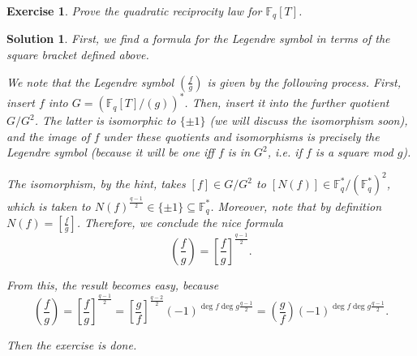 \documentclass{article}
\newtheorem{ex}{Exercise}
\theoremstyle{nonumberplain}
\newtheorem{sol}{Solution}
\newcommand{\FF}{\mathbb{F}}
\newcommand{\legendre}[2]{\genfrac{(}{)}{}{}{#1}{#2}}
\newcommand{\blegendre}[2]{\genfrac{[}{]}{}{}{#1}{#2}}
\begin{document}
\begin{ex}
Prove the quadratic reciprocity law for $\FF_q[T]$.
\end{ex}

\begin{sol}
First, we find a formula for the Legendre symbol in terms of the square bracket defined above.

We note that the Legendre symbol $\legendre f g$ is given by the following process. First, insert $f$ into $G = (\FF_q[T]/(g))^*$. Then, insert it into the further quotient $G/G^2$. The latter is isomorphic to $\{\pm 1\}$ (we will discuss the isomorphism soon), and the image of $f$ under these quotients and isomorphisms is precisely the Legendre symbol (because it will be one iff $f$ is in $G^2$, i.e. if $f$ is a square mod $g$).

The isomorphism, by the hint, takes $[f] \in G/G^2$ to $[N(f)] \in \FF_q^*/(\FF_q^*)^2$, which is taken to $N(f)^{\frac{q-1}2} \in \{\pm 1\} \subseteq \FF_q^*$. Moreover, note that by definition $N(f) = \blegendre f g$. Therefore, we conclude the nice formula
\begin{equation}
\legendre f g = \blegendre f g ^{\frac{q-1}2}.
\end{equation}

From this, the result becomes easy, because
\begin{equation}
\legendre f g = \blegendre f g ^{\frac{q-1}2} = \blegendre g f ^{\frac{q-2}2} (-1)^{\deg f \deg g \frac{q-1}2} = \legendre g f (-1)^{\deg f \deg g \frac{q-1}2}.
\end{equation}

Then the exercise is done.
\end{sol}
\end{document}
